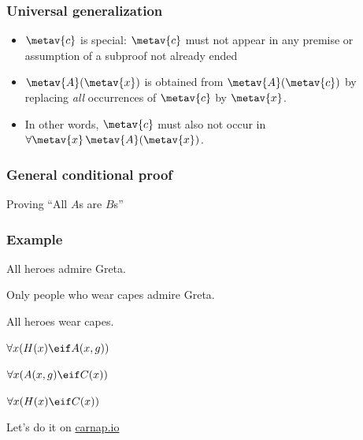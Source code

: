 \begin{frame}
  \frametitle{Universal generalization}

\begin{fitchproof}
\end{fitchproof}
  \begin{itemize}[<+->]
  \item $\metav{c}$ is special: $\metav{c}$ must not appear in any
  premise or assumption of a subproof not already ended
  \item $\metav{A}(\metav{x})$ is obtained from $\metav{A}(\metav{c})$ by replacing \emph{all} occurrences of $\metav{c}$ by $\metav{x}$.
  \item In other words, $\metav{c}$ must also not occur in $\forall
  \metav{x}\,\metav{A}(\metav{x})$.
 \end{itemize}
\end{frame}

\begin{frame}
\frametitle{General conditional proof}

Proving ``All $A$s are $B$s''

\begin{fitchproof}
  \open
  \close
\end{fitchproof}
\end{frame}

\begin{frame}
\frametitle{Example}

\begin{earg}
  \item[] All heroes admire Greta.
  \item[] Only people who wear capes admire Greta.
  \item[\therefore] All heroes wear capes.
\end{earg}

\bigskip

\begin{earg}
  \item[] $\forall x(H(x) \eif A(x,g))$
  \item[] $\forall x(A(x,g) \eif C(x))$
  \item[\therefore] $\forall x(H(x) \eif C(x))$
\end{earg}

Let's do it on \href{https://carnap.io/shared/rzach@ucalgary.ca/Practice\%20Problems\%20VII.md}{carnap.io}
\end{frame}

